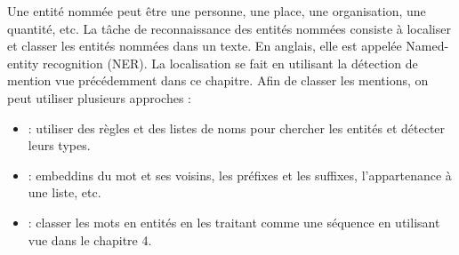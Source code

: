 \documentclass{KodeBook}
\begin{document}
Une entité nommée peut être une personne, une place, une organisation, une quantité, etc.
La tâche de reconnaissance des entités nommées consiste à localiser et classer les entités nommées dans un texte. 
En anglais, elle est appelée Named-entity recognition (NER). 
La localisation se fait en utilisant la détection de mention vue précédemment dans ce chapitre.
Afin de classer les mentions, on peut utiliser plusieurs approches :
\begin{itemize}
	\item {} : utiliser des règles et des listes de noms pour chercher les entités et détecter leurs types.
	\item {} : embeddins du mot et ses voisins, les préfixes et les suffixes, l'appartenance à une liste, etc.
	\item {} : classer les mots en entités en les traitant comme une séquence en utilisant  vue dans le chapitre 4.
	
\end{itemize}
\end{document}
